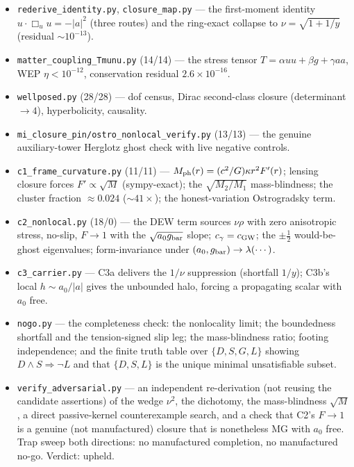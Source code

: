 \documentclass[11pt]{article}
\newcommand{\Boxu}{\Box_u}
\newcommand{\gbar}{g_{\rm bar}}
\newcommand{\cgw}{c_{\rm GW}}
\newcommand{\Mph}{M_{\rm ph}}
\begin{document}
\begin{itemize}
\item \texttt{rederive\_identity.py}, \texttt{closure\_map.py} --- the first-moment identity $u\cdot\Boxu u=-|a|^2$ (three routes) and the ring-exact collapse to $\nu=\sqrt{1+1/y}$ (residual ${\sim}10^{-13}$).
\item \texttt{matter\_coupling\_Tmunu.py} (14/14) --- the stress tensor $T=\alpha uu+\beta g+\gamma aa$, WEP $\eta<10^{-12}$, conservation residual $2.6\times10^{-16}$.
\item \texttt{wellposed.py} (28/28) --- dof census, Dirac second-class closure (determinant $\to4$), hyperbolicity, causality.
\item \texttt{mi\_closure\_pin/ostro\_nonlocal\_verify.py} (13/13) --- the genuine auxiliary-tower Herglotz ghost check with live negative controls.
\item \texttt{c1\_frame\_curvature.py} (11/11) --- $\Mph(r)=(c^2/G)\kappa r^2F'(r)$; lensing closure forces $F'\propto\sqrt M$ (sympy-exact); the $\sqrt{M_2/M_1}$ mass-blindness; the cluster fraction $\approx0.024$ (${\sim}41\times$); the honest-variation Ostrogradsky term.
\item \texttt{c2\_nonlocal.py} (18/0) --- the DEW term sources $\nu\rho$ with zero anisotropic stress, no-slip, $F\to1$ with the $\sqrt{a_0\gbar}$ slope; $c_\gamma=\cgw$; the $\pm\tfrac12$ would-be-ghost eigenvalues; form-invariance under $(a_0,\gbar)\to\lambda(\cdots)$.
\item \texttt{c3\_carrier.py} --- C3a delivers the $1/\nu$ suppression (shortfall $1/y$); C3b's local $h\sim a_0/|a|$ gives the unbounded halo, forcing a propagating scalar with $a_0$ free.
\item \texttt{nogo.py} --- the completeness check: the nonlocality limit; the boundedness shortfall and the tension-signed slip leg; the mass-blindness ratio; footing independence; and the finite truth table over $\{D,S,G,L\}$ showing $D\wedge S\Rightarrow\lnot L$ and that $\{D,S,L\}$ is the unique minimal unsatisfiable subset.
\item \texttt{verify\_adversarial.py} --- an independent re-derivation (not reusing the candidate assertions) of the wedge $\nu^2$, the dichotomy, the mass-blindness $\sqrt M$, a direct passive-kernel counterexample search, and a check that C2's $F\to1$ is a genuine (not manufactured) closure that is nonetheless MG with $a_0$ free. Trap sweep both directions: no manufactured completion, no manufactured no-go. Verdict: upheld.
\end{itemize}
\end{document}
